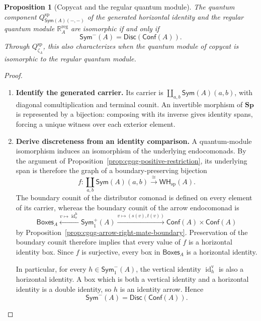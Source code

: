 \documentclass[oneside]{article}
\newcommand{\Boxes}{\mathsf{Boxes}}
\newcommand{\Conf}{\mathsf{Conf}}
\newcommand{\Sym}{\mathsf{Sym}}
\newcommand{\WH}{\mathsf{WH}}
\newcommand{\Disc}{\mathsf{Disc}}
\newcommand{\Sp}{\mathbf{Sp}}
\newcommand{\id}{\operatorname{id}}
\theoremstyle{plain}
\newtheorem{proposition}[theorem]{Proposition}
\theoremstyle{definition}
\theoremstyle{remark}
\begin{document}
\begin{proposition}[Copycat and the regular quantum module]
\label{prop:cgqg-copycat-unit-iff}
The quantum component \(Q_{\Sym(A)(-,-)}^{\mathrm{sp}}\) of the generated
horizontal identity and the regular quantum module
\(\mathbb R_A^{\mathrm{reg}}\) are isomorphic if and only if
\[
 \Sym^-(A)=\Disc(\Conf(A)).
\]
Through \(Q_{\zeta_A}^{\mathrm{sp}}\), this also characterizes when the
quantum module of copycat is isomorphic to the regular quantum module.
\end{proposition}
\begin{proof}
    \leavevmode
    \begin{enumerate}[beginpenalty=10000]
        \item \textbf{Identify the generated carrier.}
        Its carrier is \(\coprod_{a,b}\Sym(A)(a,b)\), with diagonal
        comultiplication and terminal counit. An invertible morphism
        of \(\Sp\) is represented by a bijection: composing with its
        inverse gives identity spans, forcing a unique witness over
        each exterior element.

                \item \textbf{Derive discreteness from an identity comparison.}
        A quantum-module isomorphism induces an isomorphism of the
        underlying endocomonads. By the argument of
        Proposition~\ref{prop:cgqg-positive-restriction}, its underlying
        span is therefore the graph of a boundary-preserving bijection
        \[
            f:
            \coprod_{a,b}\Sym(A)(a,b)
            \xrightarrow{\cong}
            \WH_{\mathrm{sp}}(A).
        \]
        The boundary counit of the distributor comonad is defined on
        every element of its carrier, whereas the boundary counit of the
        arrow endocomonad is
        \[
            \Boxes_A
            \xleftarrow{v\mapsto\id_v^{\mathrm h}}
            \Sym^+_1(A)
            \xrightarrow{v\mapsto(s(v),t(v))}
            \Conf(A)\times\Conf(A)
        \]
        by Proposition~\ref{prop:cgqg-arrow-right-mate-boundary}.
        Preservation of the boundary counit therefore implies that
        every value of \(f\) is a horizontal identity box. Since \(f\)
        is surjective, every box in \(\Boxes_A\) is a horizontal
        identity.

        In particular, for every \(h\in\Sym^-_1(A)\), the vertical
        identity \(\id_h^{\mathrm v}\) is also a horizontal identity.
        A box which is both a vertical identity and a horizontal
        identity is a double identity, so \(h\) is an identity arrow.
        Hence
        \[
            \Sym^-(A)=\Disc(\Conf(A)).
        \]


\end{enumerate}
\end{proof}
\end{document}
